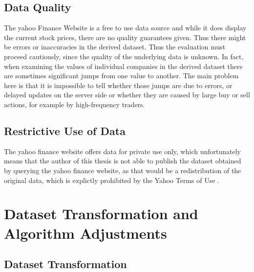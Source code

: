 \subsection{Data Quality}
\label{subsec_dataQuality}
The yahoo Finance Website is a free to use data source and while it does display the current stock prices, there are no quality guarantees given. Thus there might be errors or inaccuracies in the derived dataset. Thus the evaluation must proceed cautiously, since the quality of the underlying data is unknown. In fact, when examining the values of individual companies in the derived dataset there are sometimes significant jumps from one value to another. The main problem here is that it is impossible to tell whether those jumps are due to errors, or delayed updates on the server side or whether they are caused by large buy or sell actions, for example by high-frequency traders.  

\subsection{Restrictive Use of Data}
The yahoo finance website offers data for private use only, which unfortunately means that the author of this thesis is not able to publish the dataset obtained by querying the yahoo finance website, as that would be a redistribution of the original data, which is explictly prohibited by the Yahoo Terms of Use \cite{yahooTermsDeveloper}.

\section{Dataset Transformation and Algorithm Adjustments}
\label{sec_transformation}


\subsection{Dataset Transformation}

